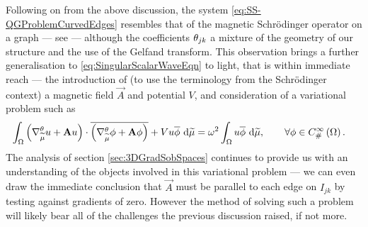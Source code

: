 Following on from the above discussion, the system \eqref{eq:SS-QGProblemCurvedEdges} resembles that of the magnetic Schr\"{o}dinger operator on a graph --- see \cite[section 7.5.1]{berkolaiko2013introduction} --- although the coefficients $\theta_{jk}$ a mixture of the geometry of our structure and the use of the Gelfand transform.
This observation brings a further generalisation to \eqref{eq:SingularScalarWaveEqn} to light, that is within immediate reach --- the introduction of (to use the terminology from the Schr\"{o}dinger context) a magnetic field $\vec{A}$ and potential $V$, and consideration of a variational problem such as
\begin{align*}
	\int_{\Omega} \left( \nabla^{\theta}_{\widetilde{\mu}}u + \mathbf{A}u \right)\cdot \overline{\left(  \nabla^{\theta}_{\widetilde{\mu}}\phi + \mathbf{A}\phi \right)} + Vu\overline{\phi}  \ \mathrm{d}\widetilde{\mu} 
	&= \omega^2\int_{\Omega}u\overline{\phi} \ \mathrm{d}\widetilde{\mu},
	\qquad \forall\phi\in C^{\infty}_{\#}\left( \Omega \right).
\end{align*}
The analysis of section \ref{sec:3DGradSobSpaces} continues to provide us with an understanding of the objects involved in this variational problem --- we can even draw the immediate conclusion that $\vec{A}$ must be parallel to each edge on $I_{jk}$ by testing against gradients of zero.
However the method of solving such a problem will likely bear all of the challenges the previous discussion raised, if not more.